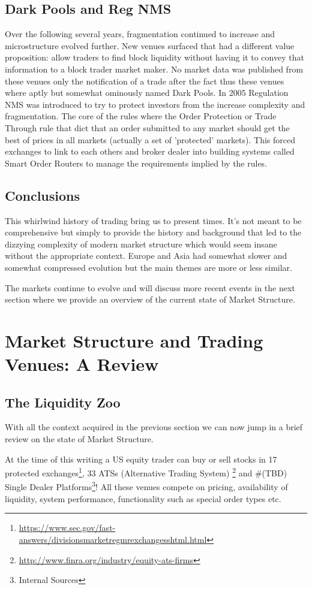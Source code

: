 \subsection{Dark Pools and Reg NMS}
Over the following several years, fragmentation continued to increase and microstructure evolved further. New venues surfaced that had a different value proposition:  allow traders to find block liquidity without having it to convey that information to a block trader market maker. No market data was  published from these venues only the notification of a trade after the fact thus these venues where aptly but somewhat ominously named Dark Pools. In 2005 Regulation NMS was introduced to try to protect investors from the increase complexity and fragmentation. The core of the rules where the Order Protection or Trade Through rule that dict that an order submitted to any market should get the best of prices in all markets (actually a set of 'protected' markets). This forced exchanges to link to each others and broker dealer into building systems called Smart Order Routers to manage the requirements implied by the rules.

\subsection{Conclusions}
This whirlwind history of trading bring us to present times. It's not meant to be comprehensive but simply to provide the history and background that led to the dizzying complexity of modern market structure which would seem insane without the appropriate context. Europe and Asia had somewhat slower and somewhat compressed evolution but the main themes are more or less similar.

The markets continue to evolve and will discuss more recent events in the next section where we provide an overview of the current state of Market Structure.

\section{Market Structure and Trading Venues: A Review}

\subsection{The Liquidity Zoo}
With all the context acquired in the previous section we can now jump in a brief review on the state of Market Structure. 

At the time of this writing a US equity trader can buy or sell stocks  in 17 protected exchanges\footnote{\url{https://www.sec.gov/fast-answers/divisionsmarketregmrexchangesshtml.html}}, 33 ATSs (Alternative Trading System) \footnote{\url{http://www.finra.org/industry/equity-ats-firms}} and #(TBD) Single Dealer Platforms\footnote{Internal Sources}!  All these venues compete on pricing, availability of liquidity, system performance, functionality such as special order types etc. 


